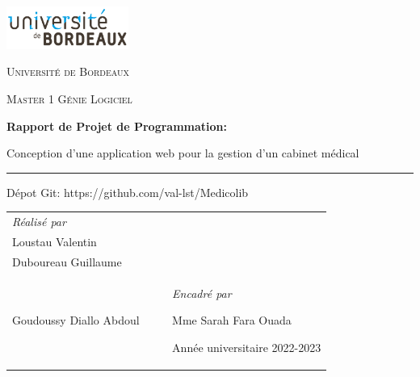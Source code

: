 \documentclass[a4paper]{report}
\begin{document}
\begin{titlepage}
    \centering
    
    \includegraphics[width=0.3\textwidth]{logo/logo_univ_bordeaux.png}\par\vspace{1cm}
    
    {\scshape\LARGE Université de Bordeaux\par}
    \vspace{1cm}
    {\scshape\Large Master 1 Génie Logiciel\par}
    \vspace{3cm}
    {\Large\bfseries Rapport de Projet de Programmation:\par}
    \vspace{1cm}
    {\Huge {Conception d'une application web pour la gestion d'un cabinet médical}\par}

    \vspace{1cm}
    \noindent\rule{0.6\textwidth}{0.7pt}
    \vspace{0.5cm}

    Dépot Git: https://github.com/val-lst/Medicolib

    \vspace{4cm}
    \begin{tabular}{@{}p{0.5\linewidth}p{0.5\linewidth}@{}}
    \raggedright
    {\large\itshape Réalisé par\par}
    \vspace{0.5cm}
    {\Large Ephrem Jennifer\\Loustau Valentin\\Duboureau Guillaume\\Goudoussy Diallo Abdoul\par}
    &
    \vspace{1cm}
    \raggedleft
    {\large\itshape Encadré par\par}
    {\Large Mme Sarah Fara Ouada\par}
    \vspace{0.5cm}

    {\large Année universitaire 2022-2023\par}
    \end{tabular}
    
\end{titlepage}
\let\cleardoublepage\clearpage
\tableofcontents
\newpage
\listoffigures
\end{document}

